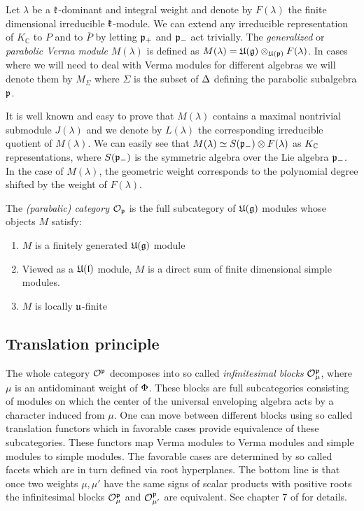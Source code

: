 Let $\lambda$ be a $\mathfrak{k}$-dominant and integral weight and denote by $F(\lambda)$ the finite dimensional irreducible $\mathfrak{k}$-module.  We can extend any irreducible representation of $K_\mathbb{C}$ to $P$ and to $\overline{P}$ by letting $\mathfrak{p}_+$ and $\mathfrak{p}_-$ act trivially. The \emph{generalized} or \emph{parabolic Verma module} $M(\lambda)$ is defined as $M(\lambda) = \mathfrak{U}(\mathfrak{g}) \otimes_{\mathfrak{U}(\mathfrak{p})} F(\lambda)$. In cases where we will need to deal with Verma modules for different algebras we will denote them by $M_\Sigma$ where $\Sigma$ is the subset of $\Delta$ defining the parabolic subalgebra $\mathfrak{p}$. 

 It is well known and easy to prove that $M(\lambda)$ contains a maximal nontrivial submodule $J(\lambda)$ and we denote by $L(\lambda)$ the corresponding irreducible quotient of $M(\lambda)$. We can easily see that $M(\lambda) \simeq S(\mathfrak{p}_-)\otimes F(\lambda)$ as $K_{\mathbb{C}}$ representations, where $S(\mathfrak{p}_-)$ is the symmetric algebra  over the Lie algebra $\mathfrak{p}_-$.
In the case of $M(\lambda)$, the geometric weight corresponds to the polynomial degree shifted by the weight of $F(\lambda)$.%

The \emph{(parabalic) category $\mathcal{O}_{\mathfrak{p}}$} is the full subcategory of $\mathfrak{U(g)}$ modules whose objects $M$ satisfy:
\begin{enumerate}
\item $M$ is a finitely generated $\mathfrak{U(g)}$ module
\item Viewed as a $\mathfrak{U(l)}$ module, $M$ is a direct sum of finite dimensional simple modules.
\item $M$ is locally $\mathfrak{u}$-finite
\end{enumerate}

\subsection{Translation principle}\label{sec:translation}
The whole category $\mathcal{O}^ {\mathfrak{p}}$ decomposes into so called \emph{infinitesimal blocks} $\mathcal{O}^{\mathfrak{p}}_\mu$, where $\mu$ is an antidominant weight of $\Phi$. These blocks are full subcategories consisting of modules on which the center of the universal enveloping algebra acts by a character induced from $\mu$.  One can move between different blocks using so called translation functors which in favorable cases provide equivalence of these subcategories. These functors map Verma modules to Verma modules and simple modules to simple modules. The favorable cases are determined by so called facets which are in turn defined via root hyperplanes. The bottom line is that once two weights $\mu, \mu'$ have the same signs of scalar products with positive roots the infinitesimal blocks $\mathcal{O}^{\mathfrak{p}}_\mu$ and $\mathcal{O}^{\mathfrak{p}}_{\mu'}$ are equivalent. See chapter 7 of \cite{humphreys_representations_2008} for details.


